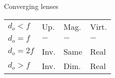 \documentclass[10 pt]{article}
\begin{document}
Converging lenses
\begin{tabular}{|l|l | l| l |}
\hline
	$d_o<f$		& 	Up. 	& 	Mag. & Virt.\\
	$d_o=f$		&	$-$ 	&	$-$  &	$-$	\\
	$d_o=2f$	&	Inv.	&	Same & Real	\\
	$d_o>f$		&	Inv.	&	Dim. & Real	\\
\hline
\end{tabular}
\end{document}
